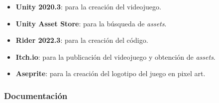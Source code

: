 \documentclass[11pt]{article}
\begin{document}
            \begin{itemize}
                \item \textbf{Unity 2020.3}: \cite{Unity} para la creación del videojuego.
                \item \textbf{Unity Asset Store}: \cite{assetstore} para la búsqueda de \textit{assets}.            
                \item \textbf{Rider 2022.3}: \cite{rider} para la creación del código.
                \item \textbf{Itch.io}: \cite{itch} para la publicación del videojuego y obtención de \textit{assets}.
                \item \textbf{Aseprite}: \cite{aseprite} para la creación del logotipo del juego en pixel art.
            \end{itemize}
            
        \subsubsection{Documentación}
\end{document}
